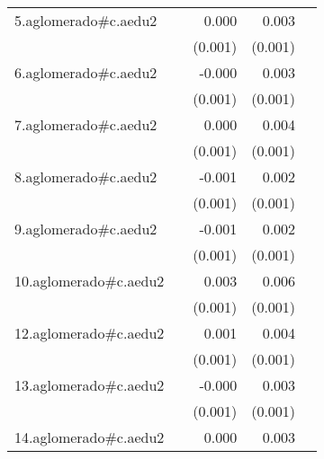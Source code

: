 {\begin{longtable}{l*{4}{D{.}{.}{-1}}}
\addlinespace
5.aglomerado#c.aedu2&                     &       0.000         &       0.003\sym{***}&                     \\
            &                     &     (0.001)         &     (0.001)         &                     \\
\addlinespace
6.aglomerado#c.aedu2&                     &      -0.000         &       0.003\sym{**} &                     \\
            &                     &     (0.001)         &     (0.001)         &                     \\
\addlinespace
7.aglomerado#c.aedu2&                     &       0.000         &       0.004\sym{***}&                     \\
            &                     &     (0.001)         &     (0.001)         &                     \\
\addlinespace
8.aglomerado#c.aedu2&                     &      -0.001         &       0.002\sym{**} &                     \\
            &                     &     (0.001)         &     (0.001)         &                     \\
\addlinespace
9.aglomerado#c.aedu2&                     &      -0.001         &       0.002         &                     \\
            &                     &     (0.001)         &     (0.001)         &                     \\
\addlinespace
10.aglomerado#c.aedu2&                     &       0.003\sym{*}  &       0.006\sym{***}&                     \\
            &                     &     (0.001)         &     (0.001)         &                     \\
\addlinespace
12.aglomerado#c.aedu2&                     &       0.001         &       0.004\sym{***}&                     \\
            &                     &     (0.001)         &     (0.001)         &                     \\
\addlinespace
13.aglomerado#c.aedu2&                     &      -0.000         &       0.003\sym{***}&                     \\
            &                     &     (0.001)         &     (0.001)         &                     \\
\addlinespace
14.aglomerado#c.aedu2&                     &       0.000         &       0.003\sym{***}&                     \\

\end{longtable}}
